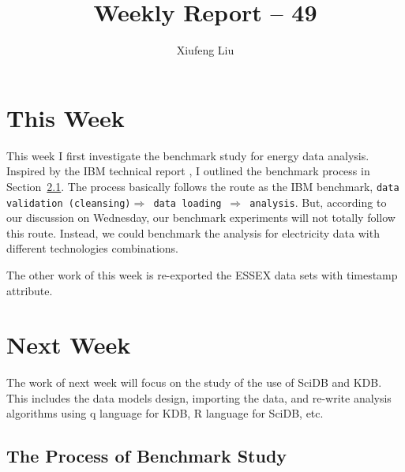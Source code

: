 \documentclass[a4paper,12pt]{llncs}
\begin{document}
\title{Weekly Report -- 49}
\author{Xiufeng Liu}
\maketitle


\section{This Week}
This week I first investigate the benchmark study for energy data analysis. Inspired by the IBM technical report \cite{ibmbenchmark}, I outlined the benchmark process in Section~\ref{sec:benchmark}. The process basically follows the route as the IBM benchmark, \texttt{data validation (cleansing)$\Rightarrow$ data loading $\Rightarrow$ analysis}. But, according to our discussion on Wednesday, our benchmark experiments will not totally follow this route. Instead, we could benchmark the analysis for electricity data with different technologies combinations. 

The other work of this week is re-exported the ESSEX data sets with timestamp attribute.

\section{Next Week}
The work of next week will focus on the study of the use of SciDB and KDB. This includes the data models design, importing the data, and re-write analysis algorithms using q language for KDB, R language for SciDB, etc.

\subsection{The Process of Benchmark Study}
\label{sec:benchmark}
\end{document}

